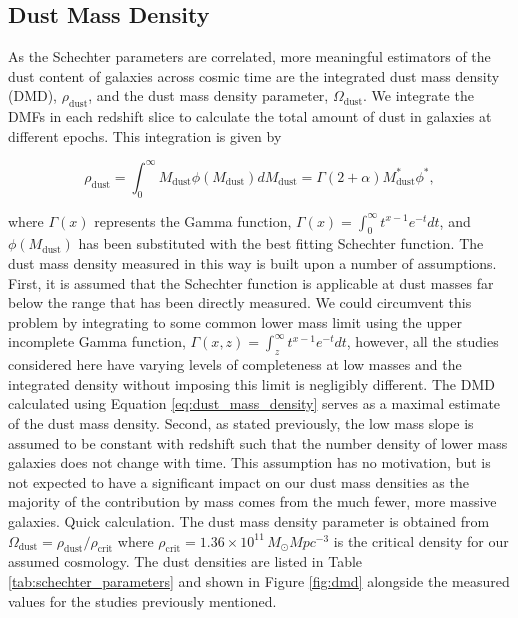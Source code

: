 \subsection{Dust Mass Density}

As the Schechter parameters are correlated, more meaningful estimators of the dust content of galaxies across cosmic time are the integrated dust mass density (DMD), $\rho_{\textrm{dust}}$, and the dust mass density parameter, $\Omega_{\textrm{dust}}$. We integrate the DMFs in each redshift slice to calculate the total amount of dust in galaxies at different epochs. This integration is given by

\begin{equation}
    \rho_{\textrm{dust}} = \int_0^\infty M_{\textrm{dust}} \phi(M_{\textrm{dust}}) dM_{\textrm{dust}} = \Gamma(2+\alpha) M_{\textrm{dust}}^* \phi^*,
    \label{eq:dust_mass_density}
\end{equation}

\noindent where $\Gamma(x)$ represents the Gamma function, $\Gamma(x) = \int_0^\infty t^{x-1}e^{-t} dt$, and $\phi(M_{\textrm{dust}})$ has been substituted with the best fitting Schechter function. The dust mass density measured in this way is built upon a number of assumptions. First, it is assumed that the Schechter function is applicable at dust masses far below the range that has been directly measured. We could circumvent this problem by integrating to some common lower mass limit using the upper incomplete Gamma function, $\Gamma(x, z) = \int_z^\infty t^{x-1}e^{-t} dt$, however, all the studies considered here have varying levels of completeness at low masses and the integrated density without imposing this limit is negligibly different. The DMD calculated using Equation \ref{eq:dust_mass_density} serves as a maximal estimate of the dust mass density. Second, as stated previously, the low mass slope is assumed to be constant with redshift such that the number density of lower mass galaxies does not change with time. This assumption has no motivation, but is not expected to have a significant impact on our dust mass densities as the majority of the contribution by mass comes from the much fewer, more massive galaxies. {\color{red}Quick calculation.} The dust mass density parameter is obtained from $\Omega_{\textrm{dust}} = \rho_{\textrm{dust}}/\rho_{\textrm{crit}}$ where $\rho_{\textrm{crit}} = 1.36\times10^{11}\,M_{\odot}Mpc^{-3}$ is the critical density for our assumed cosmology. The dust densities are listed in Table \ref{tab:schechter_parameters} and shown in Figure \ref{fig:dmd} alongside the measured values for the studies previously mentioned. 

